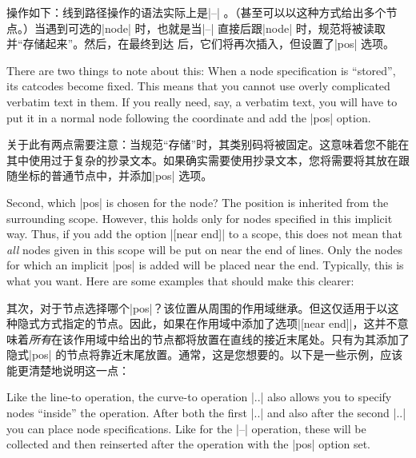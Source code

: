 操作如下：线到路径操作的语法实际上是|--| 。（甚至可以以这种方式给出多个节点。）当遇到可选的|node| 时，也就是当|--| 直接后跟|node| 时，规范将被读取并“存储起来”。然后，在最终到达 后，它们将再次插入，但设置了|pos| 选项。

There are two things to note about this: When a node specification is
``stored'', its catcodes become fixed. This means that you cannot use overly
complicated verbatim text in them. If you really need, say, a verbatim text,
you will have to put it in a normal node following the coordinate and add the
|pos| option.

关于此有两点需要注意：当规范“存储”时，其类别码将被固定。这意味着您不能在其中使用过于复杂的抄录文本。如果确实需要使用抄录文本，您将需要将其放在跟随坐标的普通节点中，并添加|pos| 选项。

Second, which |pos| is chosen for the node? The position is inherited from the
surrounding scope. However, this holds only for nodes specified in this
implicit way. Thus, if you add the option |[near end]| to a scope, this does
not mean that \emph{all} nodes given in this scope will be put on near the end
of lines. Only the nodes for which an implicit |pos| is added will be placed
near the end. Typically, this is what you want. Here are some examples that
should make this clearer:

其次，对于节点选择哪个|pos|？该位置从周围的作用域继承。但这仅适用于以这种隐式方式指定的节点。因此，如果在作用域中添加了选项|[near end]|，这并不意味着\emph{所有}在该作用域中给出的节点都将放置在直线的接近末尾处。只有为其添加了隐式|pos| 的节点将靠近末尾放置。通常，这是您想要的。以下是一些示例，应该能更清楚地说明这一点：

\begin{codeexample}[]
\end{codeexample}

Like the line-to operation, the curve-to operation |..| also allows you to
specify nodes ``inside'' the operation. After both the first |..| and also
after the second |..| you can place node specifications. Like for the |--|
operation, these will be collected and then reinserted after the operation with
the |pos| option set.

